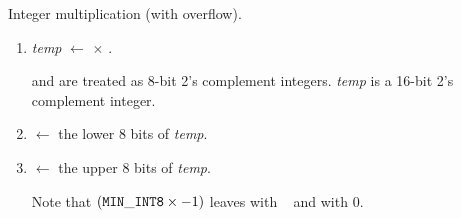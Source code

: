 


Integer multiplication (with overflow).

\begin{enumerate}

\item {\em temp} $\leftarrow$  $\times$ .

	 and  are treated as 8-bit
	2's complement integers.  {\em temp} is a 16-bit
	2's complement integer.

\item {} $\leftarrow$ the lower 8 bits of {\em temp}.

\item {} $\leftarrow$ the upper 8 bits of {\em temp}.

	Note that $({\bf\tt MIN\_INT8} \times -1)$ leaves 
		with \MinIntWord ~ and  with 0.

\end{enumerate}

